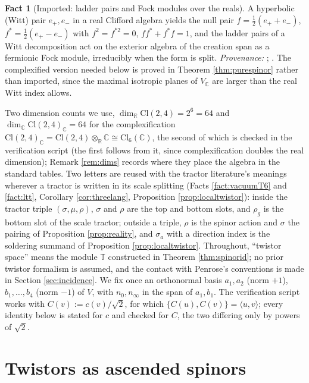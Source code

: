 \documentclass[11pt]{article}
\theoremstyle{definition}
\newtheorem{fact}[theorem]{Fact}
\newcommand{\Cl}{\mathrm{Cl}}
\newcommand{\R}{\mathbb{R}}
\newcommand{\C}{\mathbb{C}}
\newcommand{\T}{\mathbb{T}}
\newcommand{\nO}{n_0}
\newcommand{\nInf}{n_\infty}
\newcommand{\ip}[2]{\langle #1, #2\rangle}
\begin{document}
\begin{fact}[Imported: ladder pairs and Fock modules over the reals]\label{fact:fock}
A hyperbolic (Witt) pair $e_+, e_-$ in a real Clifford algebra yields the null pair $f = \tfrac12(e_+ + e_-)$, $f^* = \tfrac12(e_+ - e_-)$ with $f^2 = f^{*2} = 0$, $ff^* + f^*f = 1$, and the ladder pairs of a Witt decomposition act on the exterior algebra of the creation span as a fermionic Fock module, irreducibly when the form is split. \emph{Provenance:} \cite[\S7]{ButlerT1}; \cite[\S 4]{ButlerT3}. The complexified version needed below is proved in Theorem \ref{thm:purespinor} rather than imported, since the maximal isotropic planes of $V_\C$ are larger than the real Witt index allows.
\end{fact}

Two dimension counts we use, $\dim_\R \Cl(2,4) = 2^6 = 64$ and $\dim_\C \Cl(2,4)_\C = 64$ for the complexification $\Cl(2,4)_\C = \Cl(2,4)\otimes_\R\C \cong \Cl_6(\C)$, the second of which is checked in the verification script (the first follows from it, since complexification doubles the real dimension); Remark \ref{rem:dims} records where they place the algebra in the standard tables. Two letters are reused with the tractor literature's meanings wherever a tractor is written in its scale splitting (Facts \ref{fact:vacuumT6} and \ref{fact:ltt}, Corollary \ref{cor:threelang}, Proposition \ref{prop:localtwistor}): inside the tractor triple $(\sigma, \mu, \rho)$, $\sigma$ and $\rho$ are the top and bottom slots, and $\rho_g$ is the bottom slot of the scale tractor; outside a triple, $\rho$ is the spinor action and $\sigma$ the pairing of Proposition \ref{prop:reality}, and $\sigma_a$ with a direction index is the soldering summand of Proposition \ref{prop:localtwistor}. Throughout, ``twistor space'' means the module $\T$ constructed in Theorem \ref{thm:spinorid}; no prior twistor formalism is assumed, and the contact with Penrose's conventions is made in Section \ref{sec:incidence}. We fix once an orthonormal basis $a_1, a_2$ (norm $+1$), $b_1, \dots, b_4$ (norm $-1$) of $V$, with $\nO, \nInf$ in the span of $a_1, b_1$. The verification script works with $C(v) := c(v)/\sqrt2$, for which $\{C(u), C(v)\} = \ip{u}{v}$; every identity below is stated for $c$ and checked for $C$, the two differing only by powers of $\sqrt2$.

\section{Twistors as ascended spinors}\label{sec:spinors}
\end{document}
